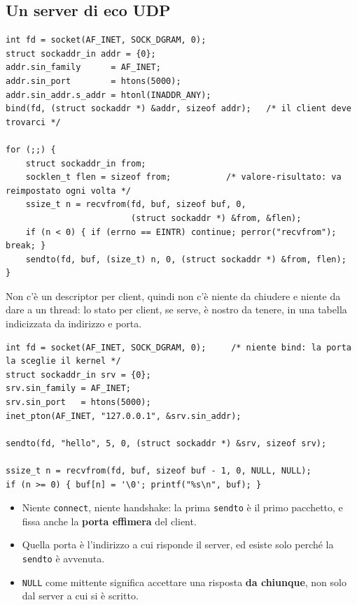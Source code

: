 \subsection{Un server di eco UDP}

\begin{lstlisting}[language={[POSIX]C}, style=wnumbers, title={Il server: un socket, un ciclo}]
int fd = socket(AF_INET, SOCK_DGRAM, 0);
struct sockaddr_in addr = {0};
addr.sin_family      = AF_INET;
addr.sin_port        = htons(5000);
addr.sin_addr.s_addr = htonl(INADDR_ANY);
bind(fd, (struct sockaddr *) &addr, sizeof addr);   /* il client deve trovarci */

for (;;) {
    struct sockaddr_in from;
    socklen_t flen = sizeof from;           /* valore-risultato: va reimpostato ogni volta */
    ssize_t n = recvfrom(fd, buf, sizeof buf, 0,
                         (struct sockaddr *) &from, &flen);
    if (n < 0) { if (errno == EINTR) continue; perror("recvfrom"); break; }
    sendto(fd, buf, (size_t) n, 0, (struct sockaddr *) &from, flen);
}
\end{lstlisting}

Non c'è un descriptor per client, quindi non c'è niente da chiudere e niente da dare a un thread: lo stato per client, se
serve, è nostro da tenere, in una tabella indicizzata da indirizzo e porta.

\begin{lstlisting}[language={[POSIX]C}, style=wnumbers, title={Il client}]
int fd = socket(AF_INET, SOCK_DGRAM, 0);     /* niente bind: la porta la sceglie il kernel */
struct sockaddr_in srv = {0};
srv.sin_family = AF_INET;
srv.sin_port   = htons(5000);
inet_pton(AF_INET, "127.0.0.1", &srv.sin_addr);

sendto(fd, "hello", 5, 0, (struct sockaddr *) &srv, sizeof srv);

ssize_t n = recvfrom(fd, buf, sizeof buf - 1, 0, NULL, NULL);
if (n >= 0) { buf[n] = '\0'; printf("%s\n", buf); }
\end{lstlisting}

\begin{itemize}
    \item Niente \texttt{connect}, niente handshake: la prima \texttt{sendto} è il primo pacchetto, e fissa anche la
          \textbf{porta effimera} del client.
    \item Quella porta è l'indirizzo a cui risponde il server, ed esiste solo perché la \texttt{sendto} è avvenuta.
    \item \texttt{NULL} come mittente significa accettare una risposta \textbf{da chiunque}, non solo dal server a cui si è
          scritto.
\end{itemize}

